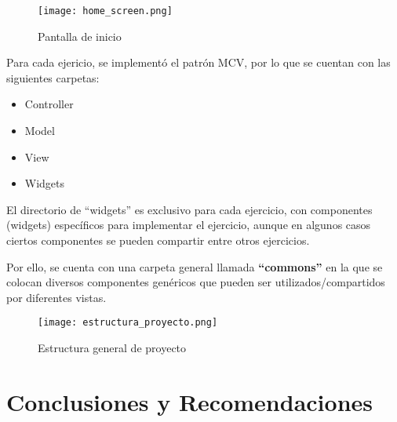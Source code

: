 \documentclass[12pt,letterpaper]{article}
\begin{document}
\begin{figure}[H]
    \centering
    \texttt{[image: home\_screen.png]}
    \caption{Pantalla de inicio}
    \label{fig:home_screen}
\end{figure}

Para cada ejericio, se implementó el patrón MCV, por lo que se cuentan con las siguientes carpetas:

\begin{itemize}
    \item Controller
    \item Model
    \item View
    \item Widgets
\end{itemize}

El directorio de “widgets” es exclusivo para cada ejercicio, con componentes (widgets) específicos para implementar el ejercicio, aunque en algunos casos ciertos componentes se pueden compartir entre otros ejercicios.

Por ello, se cuenta con una carpeta general llamada \textbf{“commons”} en la que se colocan diversos componentes genéricos que pueden ser utilizados/compartidos por diferentes vistas.

\begin{figure}[H]
    \centering
    \texttt{[image: estructura\_proyecto.png]}
    \caption{Estructura general de proyecto}
    \label{fig:estructura_proyecto}
\end{figure}










\section{Conclusiones y Recomendaciones}


\end{document}
